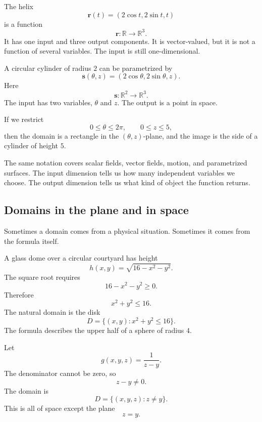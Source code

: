\begin{example}
The helix
\[
    \mathbf r(t)=(2\cos t,2\sin t,t)
\]
is a function
\[
    \mathbf r:\mathbb R\to\mathbb R^3.
\]
It has one input and three output components.  It is vector-valued, but it is not a
function of several variables.  The input is still one-dimensional.
\end{example}

\begin{example}
A circular cylinder of radius \(2\) can be parametrized by
\[
    \mathbf s(\theta,z)=(2\cos\theta,2\sin\theta,z).
\]
Here
\[
    \mathbf s:\mathbb R^2\to\mathbb R^3.
\]
The input has two variables, \(\theta\) and \(z\).  The output is a point in space.

If we restrict
\[
    0\le \theta\le 2\pi,\qquad 0\le z\le 5,
\]
then the domain is a rectangle in the \((\theta,z)\)-plane, and the image is the side of
a cylinder of height \(5\).
\end{example}

The same notation covers scalar fields, vector fields, motion, and parametrized
surfaces.  The input dimension tells us how many independent variables we choose.
The output dimension tells us what kind of object the function returns.

\subsection{Domains in the plane and in space}

Sometimes a domain comes from a physical situation.  Sometimes it comes from the
formula itself.

\begin{example}
A glass dome over a circular courtyard has height
\[
    h(x,y)=\sqrt{16-x^2-y^2}.
\]
The square root requires
\[
    16-x^2-y^2\ge 0.
\]
Therefore
\[
    x^2+y^2\le 16.
\]
The natural domain is the disk
\[
    D=\{(x,y):x^2+y^2\le 16\}.
\]
The formula describes the upper half of a sphere of radius \(4\).
\end{example}

\begin{example}
Let
\[
    g(x,y,z)=\frac{1}{z-y}.
\]
The denominator cannot be zero, so
\[
    z-y\ne0.
\]
The domain is
\[
    D=\{(x,y,z):z\ne y\}.
\]
This is all of space except the plane
\[
    z=y.
\]
\end{example}

